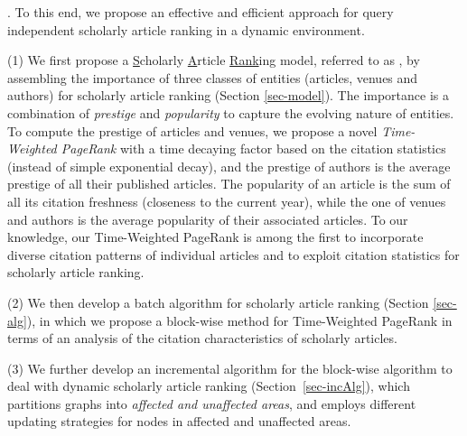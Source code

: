 .
To this end, we propose an effective and efficient approach for query independent scholarly article ranking in a dynamic environment.

\sstab(1) We first  propose a \underline{S}cholarly \underline{A}rticle \underline{Rank}ing model, referred to as \ensemblerank, by assembling the importance of three classes of entities (articles, venues and authors) for scholarly article ranking (Section \ref{sec-model}).
%
The importance is a combination of {\em prestige} and {\em popularity} to capture the evolving nature of entities.
%
To compute the prestige of articles and venues, we propose a novel {\em Time-Weighted PageRank} with a time decaying factor based on the citation statistics (instead of simple exponential decay), and the prestige of authors is the average prestige of all their published articles.
%
The popularity of an article is the sum of all its citation freshness (closeness to the current year), while the one of venues and authors is the average popularity of their associated articles.
%
%
To our knowledge, our Time-Weighted PageRank is among the first to incorporate diverse citation patterns of individual articles and to exploit citation statistics for scholarly article ranking.

\sstab(2)  We then develop  a batch algorithm for scholarly article ranking (Section \ref{sec-alg}), in which we propose a block-wise method for Time-Weighted PageRank %
in terms of an analysis of the citation characteristics of scholarly articles.

\sstab(3)
We further develop an incremental algorithm for the block-wise algorithm
to deal with dynamic scholarly article ranking (Section~\ref{sec-incAlg}), which partitions graphs into  {\em affected and unaffected areas}, and employs different updating strategies for nodes in affected and unaffected areas.


